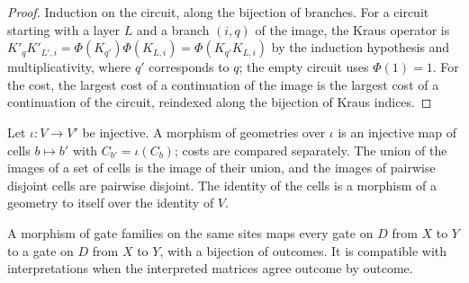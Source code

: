 \begin{proof}\leanok
    Induction on the circuit, along the bijection of branches. For a circuit starting with a
    layer $L$ and a branch $(i,q)$ of the image, the Kraus operator is
    $K'_{q}K'_{L',i}=\Phi(K_{q'})\Phi(K_{L,i})=\Phi(K_{q'}K_{L,i})$ by the induction
    hypothesis and multiplicativity, where $q'$ corresponds to $q$; the empty circuit uses
    $\Phi(1)=1$. For the cost, the largest cost of a continuation of the image is the largest
    cost of a continuation of the circuit, reindexed along the bijection of Kraus indices.
\end{proof}

\begin{definition}
    \label{def:circuits_geometry_hom}
    \leanok
    Let $\iota:V\to V'$ be injective. A morphism of geometries over $\iota$ is an
    injective map of cells $b\mapsto b'$ with $C_{b'}=\iota(C_b)$; costs are compared
    separately. The union of the images of a set of cells is the image of their
    union, and the images of pairwise disjoint cells are pairwise disjoint. The identity of the cells is a morphism of a geometry to itself over the
    identity of $V$.
\end{definition}

\begin{definition}
    \label{def:circuits_gate_morphism}
    \leanok
    A morphism of gate families on the same sites maps every gate on $D$ from $X$ to
    $Y$ to a gate on $D$ from $X$ to $Y$, with a bijection of outcomes. It is
    compatible with interpretations when the interpreted matrices agree outcome by
    outcome.
\end{definition}

